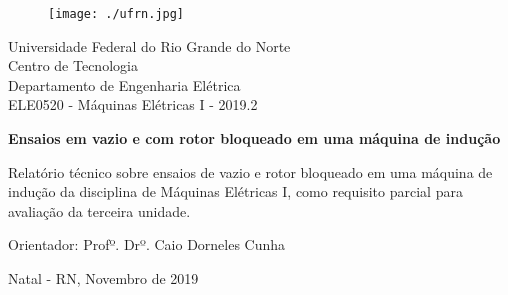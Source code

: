 \begin{titlepage}
	\begin{center}
	
	\begin{figure}[!ht]
	\centering
	\texttt{[image: ./ufrn.jpg]}
	\end{figure}

		Universidade Federal do Rio Grande do Norte \\ Centro de Tecnologia \\ Departamento de Engenharia Elétrica \\ ELE0520 - Máquinas Elétricas I - 2019.2 \\
\vspace{15pt}
        
        \vspace{85pt}
        
		\textbf{\Large{Ensaios em vazio e com rotor bloqueado em uma máquina de indução}}\\
			
	\end{center}
\vspace{1,5cm}
	
	\begin{flushright}

   \begin{list}{}{
      \setlength{\leftmargin}{4.5cm}
      \setlength{\rightmargin}{0cm}
      \setlength{\labelwidth}{0pt}
      \setlength{\labelsep}{\leftmargin}}

      \item Relatório técnico sobre ensaios de vazio e rotor bloqueado em uma máquina de indução da disciplina de Máquinas Elétricas I, como requisito parcial para avaliação da terceira unidade.

      \begin{list}{}{
      \setlength{\leftmargin}{0cm}
      \setlength{\rightmargin}{0cm}
      \setlength{\labelwidth}{0pt}
      \setlength{\labelsep}{\leftmargin}}


            \item Orientador: Profº. Drº. Caio Dorneles Cunha

      \end{list}
   \end{list}
\end{flushright}
\vspace{1cm}
\begin{center}
		\vspace{\fill}
		 Natal - RN, Novembro de 2019
			\end{center}
\end{titlepage}
\newpage